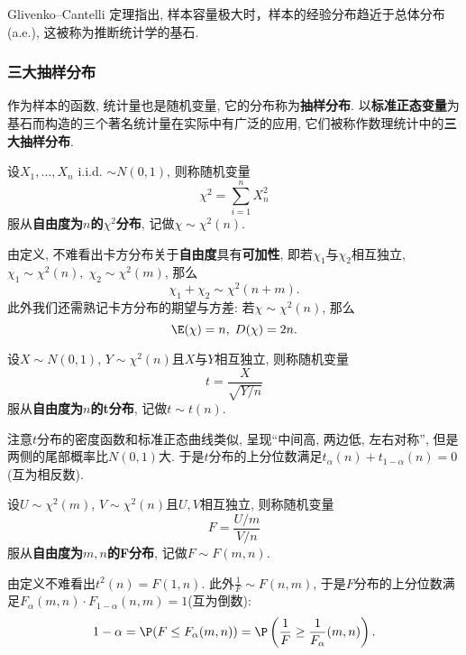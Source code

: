 \documentclass[11pt]{ctexart}
\begin{document}
Glivenko–Cantelli 定理指出, 样本容量极大时，样本的经验分布趋近于总体分布(a.e.), 这被称为推断统计学的基石. 

\subsubsection{三大抽样分布}

作为样本的函数, 统计量也是随机变量, 它的分布称为\textbf{抽样分布}. 
以\textbf{标准正态变量}为基石而构造的三个著名统计量在实际中有广泛的应用, 它们被称作数理统计中的\textbf{三大抽样分布}. 

\begin{definition}[卡方分布]
	设$X_1, \dots, X_n$ i.i.d. $\sim N(0,1)$, 则称随机变量
	\begin{equation*}
		\chi^2 = \sum_{i = 1}^n X_n^2
	\end{equation*}
	服从\textbf{自由度为$n$的$\chi^2$分布}, 记做$\chi \sim \chi^2(n)$. 
\end{definition}
由定义, 不难看出卡方分布关于\textbf{自由度}具有\textbf{可加性}, 即若$\chi_1$与$\chi_2$相互独立, $\chi_1 \sim \chi^2(n),\; \chi_2 \sim \chi^2(m)$, 那么
\begin{equation*}
	\chi_1 + \chi_2 \sim \chi^2(n+m). 
\end{equation*}
此外我们还需熟记卡方分布的期望与方差: 若$\chi \sim \chi^2(n)$, 那么
\begin{equation*}
	\E(\chi) = n, \; D(\chi) = 2n. 
\end{equation*}

\begin{definition}[t分布]
	设$X \sim N(0,1)$, $Y \sim \chi^2(n)$且$X$与$Y$相互独立, 则称随机变量
	\begin{equation*}
		t = \frac{X}{\sqrt{Y / n}}
	\end{equation*}
	服从\textbf{自由度为$n$的t分布}, 记做$t \sim t(n)$.
\end{definition}
注意$t$分布的密度函数和标准正态曲线类似, 呈现“中间高, 两边低, 左右对称”, 但是两侧的尾部概率比$N(0,1)$大. 
于是$t$分布的上分位数满足$t_{\alpha}(n) + t_{1 - \alpha}(n) = 0$(互为相反数). 

\begin{definition}[F分布]
	设$U \sim \chi^2(m)$, $V \sim \chi^2(n)$且$U,V$相互独立, 则称随机变量
	\begin{equation*}
		F = \frac{U / m}{V / n}
	\end{equation*}
	服从\textbf{自由度为$m,n$的F分布}, 记做$F \sim F(m, n)$.
\end{definition}
由定义不难看出$t^2(n) = F(1,n)$. 
此外$\frac{1}{F} \sim F(n, m)$, 于是$F$分布的上分位数满足$F_{\alpha}(m,n) \cdot F_{1-\alpha}(n,m) = 1$(互为倒数): 
\begin{equation*}
	1 - \alpha 
	= \P(F \leq F_{\alpha}(m,n)) 
	= \P \left( \frac{1}{F} \geq \frac{1}{F_{\alpha}}(m,n) \right). 
\end{equation*}  
\end{document}
